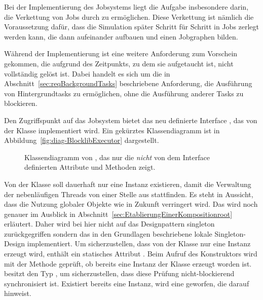 Bei der Implementierung des Jobsystems liegt die Aufgabe insbesondere darin, die Verkettung von Jobs durch  zu ermöglichen. Diese Verkettung ist nämlich die Voraussetzung dafür, dass die Simulation später Schritt für Schritt in Jobs zerlegt werden kann, die dann aufeinander aufbauen und einen Jobgraphen bilden. 

Während der Implementierung ist eine weitere Anforderung zum Vorschein gekommen, die aufgrund des Zeitpunkts, zu dem sie aufgetaucht ist, nicht vollständig gelöst ist. Dabei handelt es sich um die in Abschnitt~\ref{sec:reqBackgroundTasks} beschriebene Anforderung, die Ausführung von Hintergrundtasks zu ermöglichen, ohne die Ausführung anderer Tasks zu blockieren. 

Den Zugriffspunkt auf das Jobsystem bietet das neu definierte Interface , das von der Klasse  implementiert wird. Ein gekürztes Klassendiagramm ist in Abbildung~\vref{fig:diag-BlocklibExecutor} dargestellt.

\begin{figure}[!htb]
	\centering
	
	\caption{Klassendiagramm von , das nur die \emph{nicht} von dem Interface  definierten Attribute und Methoden zeigt.}\label{fig:diag-BlocklibExecutor}
\end{figure}

Von der Klasse  soll dauerhaft nur eine Instanz existieren, damit die Verwaltung der nebenläufigen Threads von einer Stelle aus stattfinden. Es steht in Aussicht, dass die Nutzung globaler Objekte wie  in Zukunft verringert wird. Das wird noch genauer im Ausblick in Abschnitt~\vref{sec:EtablierungEinerKompositionroot} erläutert. Daher wird bei hier nicht auf das Designpattern \gls{singleton} zurückgegriffen sondern das in den Grundlagen beschriebene lokale Singleton-Design implementiert. Um sicherzustellen, dass von der Klasse nur eine Instanz erzeugt wird, enthält  ein statisches Attribut . Beim Aufruf des Konstruktors wird mit der Methode  geprüft, ob bereits eine Instanz der Klasse erzeugt worden ist.  besitzt den Typ , um sicherzustellen, dass diese Prüfung nicht-blockierend synchronisiert ist. Existiert bereits eine Instanz, wird eine  geworfen, die darauf hinweist.

